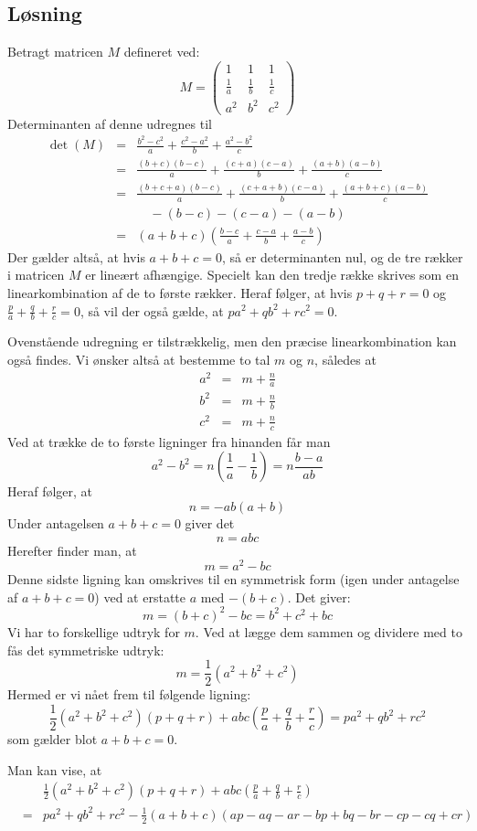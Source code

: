 \documentclass[12pt,oneside,a4paper]{article}
\newcommand{\bas}{\begin{eqnarray*}}
\newcommand{\eas}{\end{eqnarray*}}
\begin{document}
\subsection{Løsning}
Betragt matricen $M$ defineret ved:
$$
M = \left(\begin{array}{ccc}
    1 & 1 & 1 \\
    \frac{1}{a} & \frac{1}{b} & \frac{1}{c} \\
    a^2 & b^2 & c^2 
\end{array}
\right)
$$
Determinanten af denne udregnes til
\bas
\det(M) &=& \frac{b^2-c^2}{a} + \frac{c^2-a^2}{b} + \frac{a^2-b^2}{c} \\
        &=& \frac{(b+c)(b-c)}{a} + \frac{(c+a)(c-a)}{b} + \frac{(a+b)(a-b)}{c} \\
        &=& \frac{(b+c+a)(b-c)}{a} + \frac{(c+a+b)(c-a)}{b} + \frac{(a+b+c)(a-b)}{c} \\
        && \quad -(b-c) - (c-a) - (a-b) \\
        &=& (a+b+c) \left( \frac{b-c}{a} + \frac{c-a}{b} + \frac{a-b}{c}\right)
\eas
Der gælder altså, at hvis $a+b+c=0$, så er determinanten nul, og de tre rækker i matricen $M$ er lineært afhængige. Specielt kan den tredje række skrives som en linearkombination af de to første rækker.
Heraf følger, at hvis $p+q+r=0$ og $\frac{p}{a} + \frac{q}{b} + \frac{r}{c}=0$, så vil der også gælde, at $pa^2+qb^2+rc^2=0$.

Ovenstående udregning er tilstrækkelig, men den præcise linearkombination kan også findes. Vi ønsker altså at bestemme to tal $m$ og $n$, således at
\bas
a^2 &=& m+\frac{n}{a} \\
b^2 &=& m+\frac{n}{b} \\
c^2 &=& m+\frac{n}{c} 
\eas
Ved at trække de to første ligninger fra hinanden får man
$$
a^2-b^2 = n\left(\frac{1}{a}-\frac{1}{b}\right) = n \frac{b-a}{ab}
$$
Heraf følger, at 
$$
n = -ab(a+b)
$$
Under antagelsen $a+b+c=0$ giver det
$$
n=abc
$$
Herefter finder man, at
$$
m=a^2-bc
$$
Denne sidste ligning kan omskrives til en symmetrisk form (igen under antagelse af $a+b+c=0$) ved at erstatte $a$ med $-(b+c)$. Det giver:
$$
m=(b+c)^2-bc = b^2+c^2+bc
$$
Vi har to forskellige udtryk for $m$. Ved at lægge dem sammen og dividere med to fås det symmetriske udtryk:
$$
m=\frac{1}{2} (a^2+b^2+c^2)
$$
Hermed er vi nået frem til følgende ligning:
$$
\frac{1}{2} (a^2+b^2+c^2) (p+q+r) + abc \left(\frac{p}{a} + \frac{q}{b} + \frac{r}{c} \right) = pa^2+qb^2+rc^2
$$
som gælder blot $a+b+c=0$.

Man kan vise, at
\bas
&&\frac{1}{2} (a^2+b^2+c^2) (p+q+r) + abc \left(\frac{p}{a} + \frac{q}{b} + \frac{r}{c} \right) \\
&=&  pa^2+qb^2+rc^2 -\frac{1}{2} (a + b + c) (a p - a q - a r - b p + b q - b r - c p - c q + c r)
\eas
\end{document}
